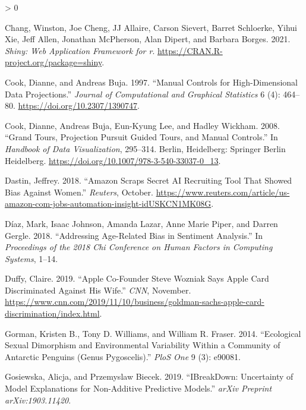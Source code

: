 \documentclass[
  article]{article}
\newlength{\cslhangindent}
\newenvironment{CSLReferences}[2] %
 {%
  \setlength{\parindent}{0pt}
  \ifodd #1 \everypar{\setlength{\hangindent}{\cslhangindent}}\ignorespaces\fi
  \ifnum #2 > 0
  \setlength{\parskip}{#2\baselineskip}
  \fi
 }%
 {}
\begin{document}
\begin{CSLReferences}{1}{0}
\leavevmode\hypertarget{ref-chang_shiny_2021}{}%
Chang, Winston, Joe Cheng, JJ Allaire, Carson Sievert, Barret Schloerke, Yihui Xie, Jeff Allen, Jonathan McPherson, Alan Dipert, and Barbara Borges. 2021. \emph{Shiny: Web Application Framework for r}. \url{https://CRAN.R-project.org/package=shiny}.

\leavevmode\hypertarget{ref-cook_manual_1997}{}%
Cook, Dianne, and Andreas Buja. 1997. {``Manual {Controls} for {High}-{Dimensional} {Data} {Projections}.''} \emph{Journal of Computational and Graphical Statistics} 6 (4): 464--80. \url{https://doi.org/10.2307/1390747}.

\leavevmode\hypertarget{ref-cook_grand_2008}{}%
Cook, Dianne, Andreas Buja, Eun-Kyung Lee, and Hadley Wickham. 2008. {``Grand {Tours}, {Projection} {Pursuit} {Guided} {Tours}, and {Manual} {Controls}.''} In \emph{Handbook of {Data} {Visualization}}, 295--314. Berlin, Heidelberg: Springer Berlin Heidelberg. \url{https://doi.org/10.1007/978-3-540-33037-0_13}.

\leavevmode\hypertarget{ref-dastin_amazon_2018}{}%
Dastin, Jeffrey. 2018. {``Amazon Scraps Secret {AI} Recruiting Tool That Showed Bias Against Women.''} \emph{Reuters}, October. \url{https://www.reuters.com/article/us-amazon-com-jobs-automation-insight-idUSKCN1MK08G}.

\leavevmode\hypertarget{ref-diaz_addressing_2018}{}%
Díaz, Mark, Isaac Johnson, Amanda Lazar, Anne Marie Piper, and Darren Gergle. 2018. {``Addressing Age-Related Bias in Sentiment Analysis.''} In \emph{Proceedings of the 2018 Chi Conference on Human Factors in Computing Systems}, 1--14.

\leavevmode\hypertarget{ref-duffy_apple_2019}{}%
Duffy, Claire. 2019. {``Apple Co-Founder {Steve} {Wozniak} Says {Apple} {Card} Discriminated Against His Wife.''} \emph{CNN}, November. \url{https://www.cnn.com/2019/11/10/business/goldman-sachs-apple-card-discrimination/index.html}.

\leavevmode\hypertarget{ref-gorman_ecological_2014}{}%
Gorman, Kristen B., Tony D. Williams, and William R. Fraser. 2014. {``Ecological Sexual Dimorphism and Environmental Variability Within a Community of {Antarctic} Penguins (Genus {Pygoscelis}).''} \emph{PloS One} 9 (3): e90081.

\leavevmode\hypertarget{ref-gosiewska_ibreakdown_2019}{}%
Gosiewska, Alicja, and Przemyslaw Biecek. 2019. {``{IBreakDown}: {Uncertainty} of Model Explanations for Non-Additive Predictive Models.''} \emph{arXiv Preprint arXiv:1903.11420}.


\end{CSLReferences}
\end{document}
